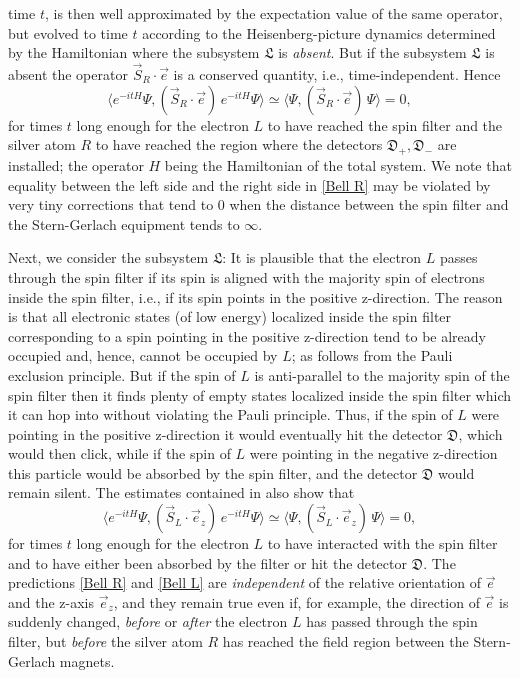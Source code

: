 \documentclass[12pt]{article}
\begin{document}
time $t$, is then well approximated by the expectation value of the same operator, but evolved to time $t$ according to the 
Heisenberg-picture dynamics determined by the Hamiltonian where the subsystem $\mathfrak{L}$ is \textit{absent}. 
But if the subsystem $\mathfrak{L}$ is absent the operator $\vec{S}_{R}\cdot \vec{e}$ is a conserved quantity, i.e., 
time-independent. Hence 
\begin{equation}\label{Bell R}
\langle e^{-itH} \Psi, (\vec{S}_{R}\cdot \vec{e})\, e^{-itH} \Psi \rangle \simeq \langle \Psi, (\vec{S}_{R}\cdot \vec{e})\, 
\Psi \rangle = 0,
\end{equation}
for times $t$ long enough for the electron $L$ to have reached the spin filter and the silver atom $R$ to have reached
the region where the detectors $\mathfrak{D}_{+}, \mathfrak{D}_{-}$ are installed; the operator $H$ being the 
Hamiltonian of the total system. We note that equality between the left side and the right side in \eqref{Bell R} 
may be violated by very tiny corrections that tend to 0 when the distance between the spin filter and the 
Stern-Gerlach equipment tends to $\infty$.

Next, we consider the subsystem $\mathfrak{L}$: It is plausible that the electron $L$ passes through the spin filter
 if its spin is aligned with the majority spin of electrons inside the spin filter, i.e., if its spin points in the positive z-direction. 
 The reason is that all electronic states (of low energy) localized inside the spin filter corresponding to a spin pointing in 
 the positive z-direction tend to be already occupied and, hence, cannot be occupied by $L$; as follows from the Pauli 
 exclusion principle. But if the spin of $L$ is anti-parallel to the majority spin of the spin filter then it finds plenty of empty 
 states localized inside the spin filter which it can hop into without violating the Pauli principle.
Thus, if the spin of $L$ were pointing in the positive z-direction it would eventually hit the detector $\mathfrak{D}$, which 
would then click, while if the spin of $L$ were pointing in the negative z-direction this particle would be absorbed by 
the spin filter, and the detector $\mathfrak{D}$ would remain silent.
The estimates contained in \cite{FFS} also show that 
\begin{equation}\label{Bell L}
\langle e^{-itH} \Psi, (\vec{S}_{L}\cdot \vec{e}_z)\, e^{-itH} \Psi \rangle \simeq \langle \Psi, (\vec{S}_{L}\cdot \vec{e}_z)\, 
\Psi \rangle = 0,
\end{equation}
for times $t$ long enough for the electron $L$ to have interacted with the spin filter and to have either been absorbed 
by the filter or hit the detector $\mathfrak{D}$. The predictions \eqref{Bell R} and \eqref{Bell L} are \textit{independent} 
of the relative orientation of $\vec{e}$  and the z-axis $\vec{e}_z$, and they remain true even if, for example, the direction of
$\vec{e}$ is suddenly changed, \textit{before} or \textit{after} the electron $L$ has passed through the spin filter, but 
\textit{before} the silver atom $R$ has reached the field region between the Stern-Gerlach magnets.
\end{document}
